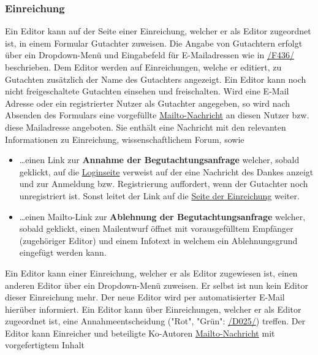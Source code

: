 \subsubsection{Einreichung} \label{ed:ein}
\begin{description}
     Ein Editor kann auf der Seite einer Einreichung, welcher er als Editor zugeordnet ist,
    in einem Formular Gutachter zuweisen. Die Angabe von Gutachtern erfolgt über ein Dropdown-Menü und Eingabefeld für E-Mailadressen
    wie in \hyperref[funkt:436]{/F436/} beschrieben.
     Dem Editor werden auf Einreichungen, welche er editiert,
    zu Gutachten zusätzlich der Name des Gutachters angezeigt.
     Ein Editor kann noch nicht freigeschaltete Gutachten einsehen und freischalten.
     Wird eine E-Mail Adresse oder ein registrierter Nutzer als Gutachter angegeben,
    so wird nach Absenden des Formulars eine vorgefüllte \hyperref[glo:mailto]{Mailto-Nachricht} an diesen Nutzer bzw. diese Mailadresse angeboten.
    Sie enthält eine Nachricht mit den relevanten Informationen zu Einreichung, wissenschaftlichem Forum, sowie
    \begin{itemize}
        \item \ldots einen Link zur \textbf{Annahme der Begutachtungsanfrage} welcher, sobald geklickt,
        auf die \hyperref[an:log]{Loginseite} verweist auf der eine Nachricht des Dankes anzeigt und zur Anmeldung bzw.
        Registrierung auffordert, wenn der Gutachter noch unregistriert ist. Sonst leitet der Link auf die
        \hyperref[nut:ein]{Seite der Einreichung} weiter.
        \item \ldots einen Mailto-Link zur \textbf{Ablehnung der Begutachtungsanfrage} welcher, sobald
        geklickt, einen Mailentwurf öffnet mit vorausgefülltem Empfänger (zugehöriger Editor)
        und einem Infotext in welchem ein Ablehnungsgrund eingefügt werden kann.
    \end{itemize}
     Ein Editor kann einer Einreichung, welcher er als Editor zugewiesen ist, einen anderen Editor
    über ein Dropdown-Menü zuweisen. Er selbst ist nun kein Editor dieser Einreichung mehr. Der neue Editor wird per
    automatisierter E-Mail hierüber informiert.
     Ein Editor kann über Einreichungen, welcher er als Editor zugeordnet ist,
    eine Annahmeentscheidung ("Rot", "Grün": \hyperref[d025]{/D025/}) treffen.
    Der Editor kann Einreicher und beteiligte Ko-Autoren \hyperref[glo:mailto]{Mailto-Nachricht} mit vorgefertigtem Inhalt

\end{description}

